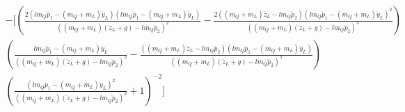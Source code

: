 \documentclass[11pt]{article}
\begin{document}
\begin{align*}
& - [ ( \frac{ 2(l m_Q \dddot{p}_1 - (m_Q+m_L) \dddot{y}_L)(l m_Q \ddot{p}_1 - (m_Q+m_L) \ddot{y}_L) } { ((m_Q+m_L) ( \ddot{z}_L + g) - l m_Q \ddot{p}_2)^2} - \frac{ 2((m_Q+m_L) \dddot{z}_L - l m_Q \dddot{p}_2)(l m_Q \ddot{p}_1 - (m_Q+m_L) \ddot{y}_L)^2 }{ ((m_Q+m_L) (\ddot{z}_L+g) - l m_Q \ddot{p}_2)^3 } ) \\
& ( \frac{ l m_Q \dddot{p}_1 - (m_Q+m_L) \dddot{y}_L } { ((m_Q+m_L) (\ddot{z}_L+g) - l m_Q \ddot{p}_2)^2 } - \frac{ ( (m_Q+m_L) \dddot{z}_L - l m_Q \dddot{p}_2)(l m_Q \ddot{p}_1 - (m_Q+m_L) \ddot{y}_L)} { ((m_Q+m_L) (\ddot{z}_L+g) - l m_Q \ddot{p}_2)^2} ) \\
& ( \frac{ (l m_Q \ddot{p}_1 - (m_Q+m_L) \ddot{y}_L)^2 }{ ((m_Q+m_L) ( \ddot{z}_L+g) - l m_Q \ddot{p}_2)^2 } + 1 )^{-2} ]
\end{align*}
\end{document}
